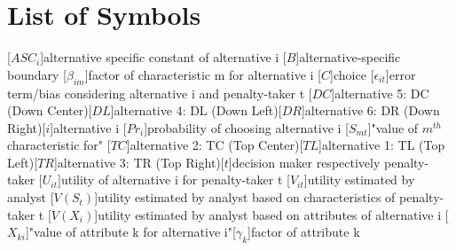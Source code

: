 \documentclass[12pt,dvipsnames]{article}%
\begin{document}
\section*{List of Symbols} 
\rule[0pt]{0mm}{10pt} %
\begin{acronym}[\hspace{3.5cm}]
\setlength{\itemsep}{-\parsep}

[$ASC_i$]{alternative specific constant of alternative i}
[$B$]{alternative-specific boundary}
[$\beta_{im}$]{factor of characteristic m for alternative i}
[$C$]{choice}
[$\epsilon_{it}$]{error term/bias considering alternative i and penalty-taker t}
[$DC$]{alternative 5}{: DC (Down Center)}\footnotemark[3]
[$DL$]{alternative 4}{: DL (Down Left)}\footnotemark[3]
[$DR$]{alternative 6}{: DR (Down Right)}\footnotemark[3]
[$i$]{alternative i}
[$Pr_i$]{probability of choosing alternative i}
[$S_{mt}$]{"value of $m^{th}$ characteristic for"}
[$TC$]{alternative 2}{: TC (Top Center)}\footnotemark[3]
[$TL$]{alternative 1}{: TL (Top Left)}\footnotemark[3]
[$TR$]{alternative 3}{: TR (Top Right)}\footnotemark[3]
[$t$]{decision maker respectively penalty-taker}
[$U_{it}$]{utility of alternative i for penalty-taker t}
[$V_{it}$]{utility estimated by analyst}
[$V(S_t)$]{utility estimated by analyst based on characteristics of penalty-taker t}
[$V(X_i)$]{utility estimated by analyst based on attributes of alternative i}
[$X_{ki}$]{"value of attribute k for alternative i"}\footnotemark[2]
[$\gamma_{k}$]{factor of attribute k}
\end{acronym}

\vspace{+2.5cm}

\begin{footnotesize}  \\
   \\
  \end{footnotesize}
\end{document}
